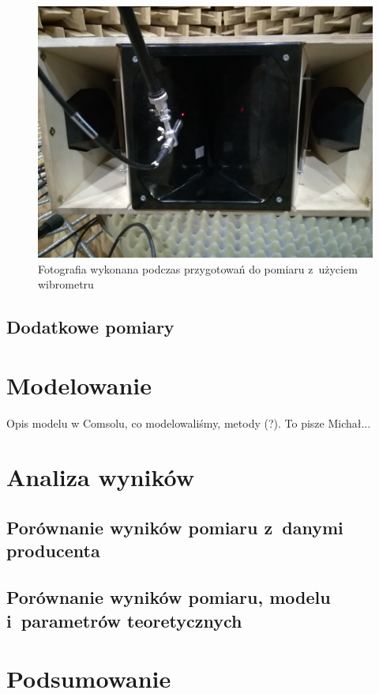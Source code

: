 \documentclass[12pt]{oska}
\begin{document}
			\begin{figure}[h!]
				\centering
				\includegraphics[width=\textwidth]{zdjecie_wibro.jpg}
				\caption{Fotografia wykonana podczas przygotowań do pomiaru z~użyciem wibrometru}
				\label{r:zdjecie_wibro}
			\end{figure}

	
	\subsection{Dodatkowe pomiary}\label{ss:dodatkowe}

\section{Modelowanie}

	\color{orange} Opis modelu w Comsolu, co modelowaliśmy, metody (?). To pisze Michał...
	\color{black}

\section{Analiza wyników}

	\subsection{Porównanie wyników pomiaru z~danymi producenta}
	
	\subsection{Porównanie wyników pomiaru, modelu i~parametrów teoretycznych}

\section{Podsumowanie}

\printbibliography
\end{document}
